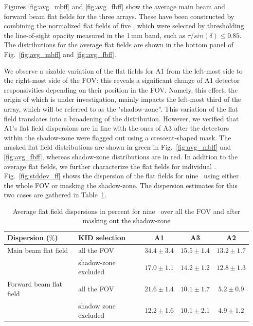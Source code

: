Figures \ref{fig:avg_mbff} and \ref{fig:avg_fbff} show the average main beam and
forward beam flat fields for the three arrays. These have been constructed by
combining the normalized flat fields of five \bms, which were
selected by thresholding the line-of-sight opacity measured in the 1\,mm band,
such as $\tau/sin(\delta) \leq 0.85$. The distributions for the average flat
fields are shown in the bottom panel of Fig.~\ref{fig:avg_mbff} and
\ref{fig:avg_fbff}.

We observe a sizable variation of the flat fields for A1 from the left-most side
to the right-most side of the FOV: this reveals a significant change of A1
detector responsivities depending on their position in the FOV. Namely, this
effect, the origin of which is under investigation, mainly impacts the left-most
third of the array, which will be referred to as the "shadow-zone''. This
variation of the flat field translates into a broadening of the
distribution. However, we verified that A1's flat field dispersions are in line
with the ones of A3 after the detectors within the shadow-zone were flagged out
using a crescent-shaped mask. The masked flat field distributions are shown in
green in Fig.~\ref{fig:avg_mbff} and \ref{fig:avg_fbff}, whereas shadow-zone
distributions are in red. In addition to the average flat fields, we further
characterize the flat fields for individual \bms. Fig.~\ref{fig:stddev_ff}
shows the dispersion of the flat fields for nine \bms\ using
either the whole FOV or masking the shadow-zone. The dispersion estimates for
this two cases are gathered in Table~\ref{tab:flatfields}.

\begin{table}[h]
\begin{center}
\begin{tabular}{|l|l|c|c|c|}
\hline
 Dispersion ($\%$)    & KID selection  &  A1 & A3  & A2 \\
\hline
Main beam flat field  & all the FOV           & $34.4 \pm 3.4$    & $15.5 \pm 1.4$  &  $13.2 \pm 1.7$  \\
                      & shadow-zone excluded  & $17.0 \pm 1.1$    & $14.2 \pm 1.2$  &  $12.8 \pm 1.3$\\
\hline
Forward beam flat field  & all the FOV           & $21.6 \pm 1.4$  & $10.1 \pm 1.7$  & $5.2 \pm 0.9$   \\
                         & shadow zone excluded  & $12.2 \pm 1.6$  & $10.1 \pm 2.1$  & $4.9 \pm 1.2$ \\
\hline
\end{tabular}
\caption[Flat field dispersions]{Average flat field dispersions in percent for
  nine \bms\ over all the FOV and after masking out the
  shadow-zone}
\end{center}
\label{tab:flatfields}
\end{table}


